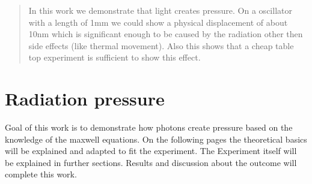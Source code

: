 \documentclass[12pt,a4paper]{article}
\begin{document}

\pagebreak
\setlength{\columnsep}{20pt}

\begin{abstract}
\noindent
In this work we demonstrate that light creates pressure. On a oscillator with a length of 1mm we could show a physical displacement of about 10nm which is significant enough to be caused by the radiation other then side effects (like thermal movement). Also this shows that a cheap table top experiment is sufficient to show this effect.
\end{abstract}

%


\section{Radiation pressure}
Goal of this work is to demonstrate how photons create pressure based on the knowledge of the maxwell equations.
On the following pages the theoretical basics will be explained and adapted to fit the experiment.
The Experiment itself will be explained in further sections. Results and discussion about the outcome
will complete this work.

\end{document}
